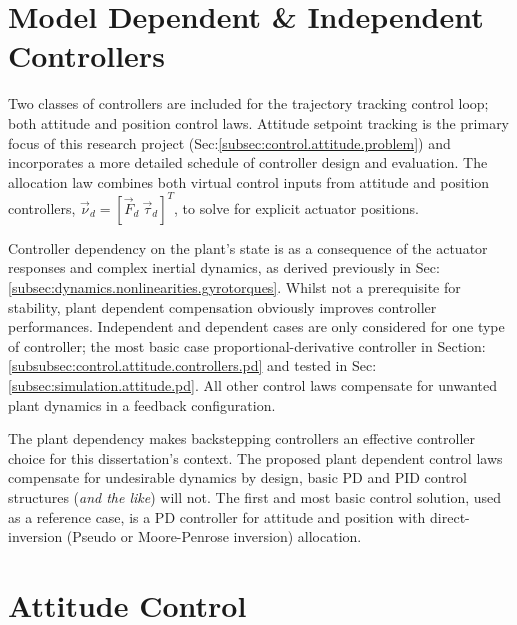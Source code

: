 \section{Model Dependent \& Independent Controllers}
Two classes of controllers are included for the trajectory tracking control loop; both attitude and position control laws. Attitude setpoint tracking is the primary focus of this research project (Sec:\ref{subsec:control.attitude.problem}) and incorporates a more detailed schedule of controller design and evaluation. The allocation law combines both virtual control inputs from attitude and position controllers, $\vec{\nu}_d=[\vec{F}_d~\vec{\tau}_d]^T$, to solve for explicit actuator positions. 
\par
Controller dependency on the plant's state is as a consequence of the actuator responses and complex inertial dynamics, as derived previously in Sec:\ref{subsec:dynamics.nonlinearities.gyrotorques}. Whilst not a prerequisite for stability, plant dependent compensation obviously improves controller performances. Independent and dependent cases are only considered for one type of controller; the most basic case proportional-derivative controller in Section:\ref{subsubsec:control.attitude.controllers.pd} and tested in Sec:\ref{subsec:simulation.attitude.pd}. All other control laws compensate for unwanted plant dynamics in a feedback configuration.
\par
The plant dependency makes backstepping controllers an effective controller choice for this dissertation's context. The proposed plant dependent control laws compensate for undesirable dynamics by design, basic PD and PID control structures (\emph{and the like}) will not. The first and most basic control solution, used as a reference case, is a PD controller for attitude and position with direct-inversion (Pseudo or Moore-Penrose inversion) allocation. 
\section{Attitude Control}
\label{sec:control.attitude}
